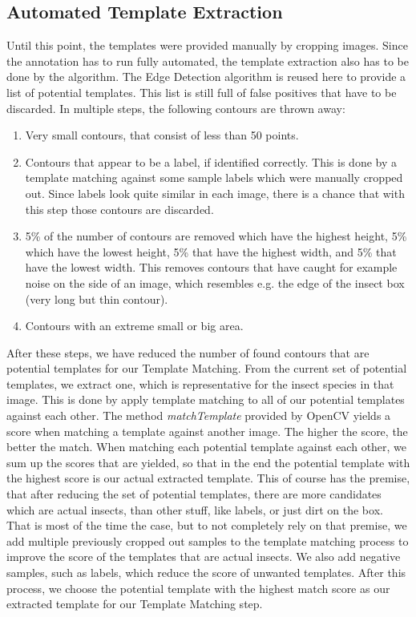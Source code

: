 \subsection{Automated Template Extraction}
Until this point, the templates were provided manually by cropping images. 
Since the annotation has to run fully automated, the template extraction also has to be done by the algorithm.
The Edge Detection algorithm is reused here to provide a list of potential templates.
This list is still full of false positives that have to be discarded.
In multiple steps, the following contours are thrown away: 
\begin{enumerate}
	\item Very small contours, that consist of less than 50 points.
	\item Contours that appear to be a label, if identified correctly.
	This is done by a template matching against some sample labels which were manually cropped out.
	Since labels look quite similar in each image, there is a chance that with this step those contours are discarded.
	\item 5\% of the number of contours are removed which have the highest height, 5\% which have the lowest height, 5\% that have the highest width, and 5\% that have the lowest width.
	This removes contours that have caught for example noise on the side of an image, which resembles e.g. the edge of the insect box (very long but thin contour).
	\item Contours with an extreme small or big area.
\end{enumerate}
After these steps, we have reduced the number of found contours that are potential templates for our Template Matching.
From the current set of potential templates, we extract one, which is representative for the insect species in that image.
This is done by apply template matching to all of our potential templates against each other.
The method \emph{matchTemplate} provided by OpenCV yields a score when matching a template against another image.
The higher the score, the better the match.
When matching each potential template against each other, we sum up the scores that are yielded, so that in the end the potential template with the highest score is our actual extracted template.
This of course has the premise, that after reducing the set of potential templates, there are more candidates which are actual insects, than other stuff, like labels, or just dirt on the box.
That is most of the time the case, but to not completely rely on that premise, we add multiple previously cropped out samples to the template matching process to improve the score of the templates that are actual insects.
We also add negative samples, such as labels, which reduce the score of unwanted templates.
After this process, we choose the potential template with the highest match score as our extracted template for our Template Matching step.

